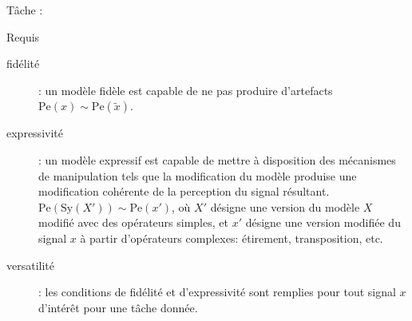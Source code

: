 \begin{frame}{\alert{Tâche} : }
\begin{center}

\vspace{.8cm}
 
\end{center}
\end{frame}

\begin{frame}{Requis}
\begin{description}
  \item[fidélité]: un modèle fidèle est capable de ne pas produire d'artefacts  $\mathrm{Pe}(x) \sim \mathrm{Pe}(\tilde{x})$.
  \item[expressivité]: un modèle expressif est capable de mettre à disposition des mécanismes de manipulation tels que la modification du modèle produise une modification cohérente de la perception du signal résultant.  $\mathrm{Pe}(\mathrm{Sy}(X')) \sim \mathrm{Pe}(x')$, où $X'$ désigne une version du modèle $X$ modifié avec des opérateurs simples, et $x'$ désigne une version modifiée du signal $x$ à partir d'opérateurs complexes: étirement, transposition, etc.
  \item[versatilité]: les conditions de fidélité et d'expressivité sont remplies pour tout signal $x$ d'intérêt pour une tâche donnée.
\end{description}
\end{frame}


